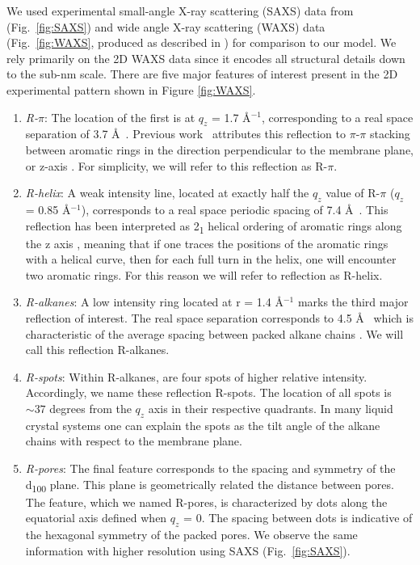 \documentclass[journal=jpcbfk,manusciprt=article]{achemso}
\begin{document}
  We used experimental small-angle X-ray scattering (SAXS) data from
  \cite{feng_thin_2016} (Fig.~\ref{fig:SAXS}) and wide angle X-ray scattering
  (WAXS) data (Fig.~\ref{fig:WAXS}, produced as described in
  \cite{feng_scalable_2014}) for comparison to our model. We rely primarily on the 2D WAXS data
  since it encodes all structural details down to the sub-nm scale.  There are
  five major features of interest present in the 2D experimental pattern shown in
  Figure \ref{fig:WAXS}.

  \begin{enumerate} 
  
	\item \textit{R-$\pi$}: The location of the first is at $q_z$ = 1.7
	\AA$^{-1}$, corresponding to a real space separation of 3.7 \AA~. Previous
	work~\cite{feng_scalable_2014} attributes this reflection to $\pi$-$\pi$
	stacking between aromatic rings in the direction perpendicular to the membrane
	plane, or z-axis \cite{feng_scalable_2014}. For simplicity, we will refer to
	this reflection as R-$\pi$.
 
	\item \textit{R-helix}: A weak intensity line, located at exactly half
	the $q_z$ value of R-$\pi$ ($q_z$ = 0.85 \AA$^{-1}$), corresponds to a real
	space periodic spacing of 7.4 \AA~. This reflection has been interpreted as
	2\textsubscript{1} helical ordering of aromatic rings along the z axis
	\cite{feng_scalable_2014}, meaning that if one traces the positions of the
	aromatic rings with a helical curve, then for each full turn in the helix, one
	will encounter two aromatic rings. For this reason we will refer to reflection
	as R-helix. 

	\item \textit{R-alkanes}: A low intensity ring located at r = 1.4
	\AA$^{-1}$ marks the third major reflection of interest. The real space
	separation corresponds to 4.5 \AA~ which is characteristic of the average
	spacing between packed alkane chains \cite{mcintosh_organization_1980}. We will
	call this reflection R-alkanes.

	\item \textit{R-spots}: Within R-alkanes, are four spots of higher
	relative intensity.  Accordingly, we name these reflection R-spots. The
	location of all spots is $\sim 37$ degrees from the $q_z$ axis in their
	respective quadrants. In many liquid crystal systems one can explain the spots
	as the tilt angle of the alkane chains with respect to the membrane
	plane\cite{govind_simple_2001}.
 
	\item \textit{R-pores}: The final feature corresponds to the spacing
	and symmetry of the d\textsubscript{100} plane. This plane is geometrically
	related the distance between pores. The feature, which we named R-pores, is
	characterized by dots along the equatorial axis defined when $q_z$ = 0. The
	spacing between dots is indicative of the hexagonal symmetry of the packed
	pores. We observe the same information with higher resolution using SAXS
	(Fig.~\ref{fig:SAXS}). 

  \end{enumerate}
\end{document}
